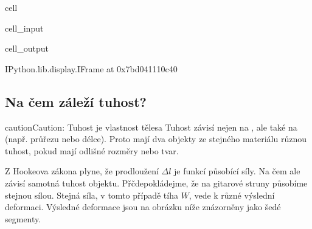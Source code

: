 \documentclass[letterpaper,10pt,english]{jupyterBook}
\begin{document}
\begin{sphinxuseclass}{cell}\begin{sphinxVerbatimInput}

\begin{sphinxuseclass}{cell_input}
\begin{sphinxVerbatim}[commandchars=\\\{\}]
  
\end{sphinxVerbatim}

\end{sphinxuseclass}\end{sphinxVerbatimInput}
\begin{sphinxVerbatimOutput}

\begin{sphinxuseclass}{cell_output}
\begin{sphinxVerbatim}[commandchars=\\\{\}]
\PYGZlt{}IPython.lib.display.IFrame at 0x7bd041110c40\PYGZgt{}
\end{sphinxVerbatim}

\end{sphinxuseclass}\end{sphinxVerbatimOutput}

\end{sphinxuseclass}

\subsection{Na čem záleží tuhost?}
\label{\detokenize{Prednasky/2_2_Hooke_u016fv_z_xe1kon:na-cem-zalezi-tuhost}}
\begin{sphinxadmonition}{caution}{Caution:}
\sphinxAtStartPar
Tuhost je vlastnost tělesa
Tuhost závisí nejen na , ale také na  (např. průřezu nebo délce). Proto mají dva objekty ze stejného materiálu různou tuhost, pokud mají odlišné rozměry nebo tvar.
\end{sphinxadmonition}

\sphinxAtStartPar
Z Hookeova zákona plyne, že prodloužení \(\Delta l\) je funkcí působící síly. Na čem ale závisí samotná tuhost objektu. Přčdepokládejme, že na gitarové struny působíme stejnou sílou. Stejná síla, v tomto případě tíha \(W\), vede k různé výslední deformaci. Výsledné deformace jsou na obrázku níže znázorněny jako šedé segmenty.
\end{document}
